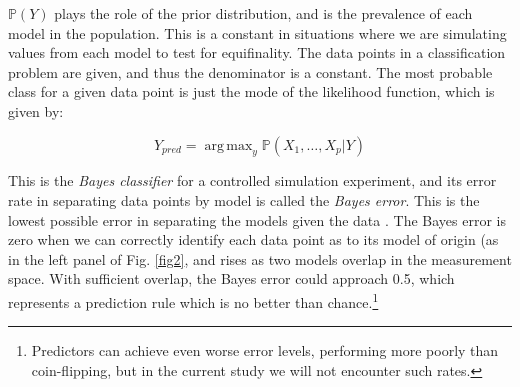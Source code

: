 \documentclass[10pt,letterpaper]{article}
\DeclareMathOperator*{\argmax}{arg\,max}
\begin{document}
\(\mathbb{P}(Y)\) plays the role of the prior distribution, and is the
prevalence of each model in the population. This is a constant in
situations where we are simulating values from each model to test for
equifinality. The data points in a classification problem are given, and
thus the denominator is a constant. The most probable class for a given
data point is just the mode of the likelihood function, which is given
by:

\begin{equation}
Y_{pred} = \argmax_y \mathbb{P}(X_1, \ldots, X_p | Y)
\label{eq:map-class-bayes}
\end{equation}

This is the \emph{Bayes classifier} for a controlled simulation
experiment, and its error rate in separating data points by model is
called the \emph{Bayes error}. This is the lowest possible error in
separating the models given the data
\cite{devijver1982pattern, fukunaga1990introduction, hastie2009elements}.
The Bayes error is zero when we can correctly identify each data point
as to its model of origin (as in the left panel of Fig. \ref{fig2}, and rises as two models overlap in the
measurement space. With sufficient overlap, the Bayes error could
approach 0.5, which represents a prediction rule which is no better than
chance.\footnote{Predictors can achieve even worse error levels, performing more poorly than coin-flipping, but in the current study we will not encounter such rates.}
\end{document}
